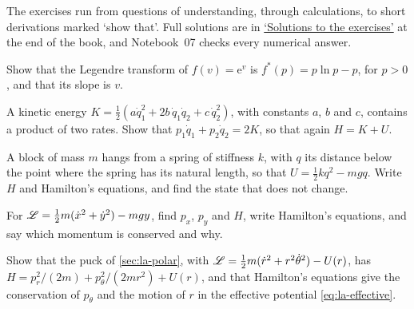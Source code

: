 \label{sec:ha-exercises}

The exercises run from questions of understanding, through calculations,
to short derivations marked `show that'. Full solutions are in
\hyperref[sec:ha-solutions]{`Solutions to the exercises'} at the end of
the book, and Notebook~07 checks every numerical answer.

\begin{exercise}
\label{ex:ha-exp}
Show that the Legendre transform of $f(v) = \mathrm{e}^v$ is $f^*(p) =
p\ln p - p$, for $p > 0$, and that its slope is $v$.
\end{exercise}

\begin{exercise}
\label{ex:ha-cross}
A kinetic energy $K = \frac12(a\dot{q}_1^2 + 2b\,\dot{q}_1\dot{q}_2 +
c\,\dot{q}_2^2)$, with constants $a$, $b$ and $c$, contains a product of
two rates. Show that $p_1\dot{q}_1 + p_2\dot{q}_2 = 2K$, so that again
$H = K + U$.
\end{exercise}

\begin{exercise}
\label{ex:ha-vertical}
A block of mass $m$ hangs from a spring of stiffness $k$, with $q$ its
distance below the point where the spring has its natural length, so that
$U = \frac12 kq^2 - mgq$. Write $H$ and Hamilton's equations, and find the
state that does not change.
\end{exercise}

\begin{exercise}
\label{ex:ha-plane}
For $\mathscr{L} = \frac12 m(\dot{x}^2 + \dot{y}^2) - mgy$, find $p_x$, $p_y$
and $H$, write Hamilton's equations, and say which momentum is conserved
and why.
\end{exercise}

\begin{exercise}
\label{ex:ha-puck}
Show that the puck of \cref{sec:la-polar}, with $\mathscr{L} = \frac12 m(\dot{r}^2
+ r^2\dot\theta^2) - U(r)$, has $H = p_r^2/(2m) + p_\theta^2/(2mr^2) +
U(r)$, and that Hamilton's equations give the conservation of $p_\theta$
and the motion of $r$ in the effective potential \cref{eq:la-effective}.
\end{exercise}

